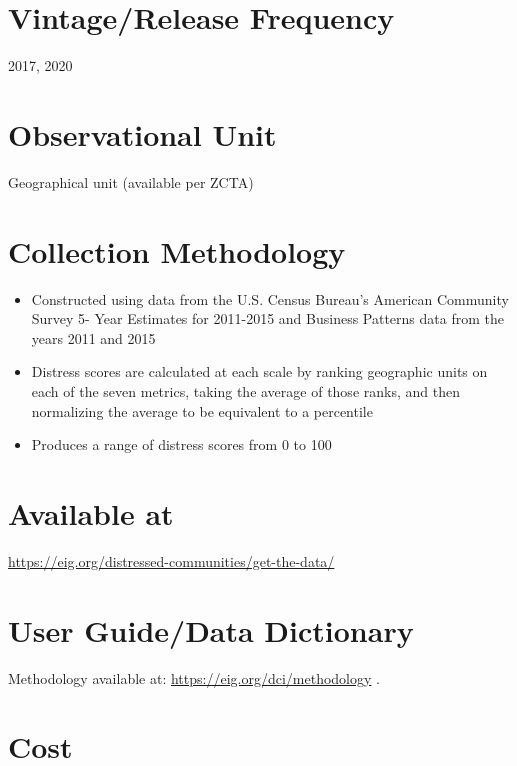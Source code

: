 \documentclass[
]{book}
\providecommand{\tightlist}{%
  \setlength{\itemsep}{0pt}\setlength{\parskip}{0pt}}
\begin{document}
\hypertarget{vintagerelease-frequency-23}{%
\section{Vintage/Release Frequency}\label{vintagerelease-frequency-23}}

2017, 2020

\hypertarget{observational-unit-23}{%
\section{Observational Unit}\label{observational-unit-23}}

Geographical unit (available per ZCTA)

\hypertarget{collection-methodology-23}{%
\section{Collection Methodology}\label{collection-methodology-23}}

\begin{itemize}
\tightlist
\item
  Constructed using data from the U.S. Census Bureau's American Community Survey 5- Year Estimates for 2011-2015 and Business Patterns data from the years 2011 and 2015
\item
  Distress scores are calculated at each scale by ranking geographic units on each of the seven metrics, taking the average of those ranks, and then normalizing the average to be equivalent to a percentile
\item
  Produces a range of distress scores from 0 to 100
\end{itemize}

\hypertarget{available-at-23}{%
\section{Available at}\label{available-at-23}}

\url{https://eig.org/distressed-communities/get-the-data/}

\hypertarget{user-guidedata-dictionary-23}{%
\section{User Guide/Data Dictionary}\label{user-guidedata-dictionary-23}}

Methodology available at: \url{https://eig.org/dci/methodology} .

\hypertarget{cost-23}{%
\section{Cost}\label{cost-23}}
\end{document}
